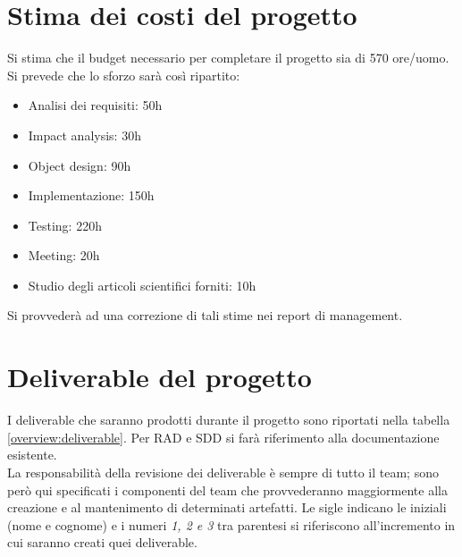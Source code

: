 \section{Stima dei costi del progetto}
Si stima che il budget necessario per completare il progetto sia di 570 ore/uomo. Si prevede che lo sforzo sarà così ripartito:\\
\begin{itemize}
\item Analisi dei requisiti: 50h
\item Impact analysis: 30h
\item Object design: 90h
\item Implementazione: 150h
\item Testing: 220h
\item Meeting: 20h
\item Studio degli articoli scientifici forniti: 10h
\end{itemize}

Si provvederà ad una correzione di tali stime nei report di management.

\section{Deliverable del progetto}
I deliverable che saranno prodotti durante il progetto sono riportati nella tabella \ref{overview:deliverable}. Per RAD e SDD si farà riferimento alla documentazione esistente.\\
La responsabilità della revisione dei deliverable è sempre di tutto il team; sono però qui specificati i componenti del team che provvederanno maggiormente alla creazione e al mantenimento di determinati artefatti. Le sigle indicano le iniziali (nome e cognome) e i numeri \emph{1, 2 e 3} tra parentesi si riferiscono all'incremento in cui saranno creati quei deliverable.

